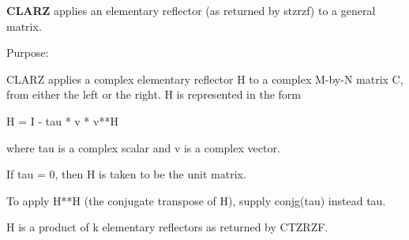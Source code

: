 {\bfseries C\+L\+A\+R\+Z} applies an elementary reflector (as returned by stzrzf) to a general matrix. 

 \begin{DoxyParagraph}{Purpose\+: }
\begin{DoxyVerb} CLARZ applies a complex elementary reflector H to a complex
 M-by-N matrix C, from either the left or the right. H is represented
 in the form

       H = I - tau * v * v**H

 where tau is a complex scalar and v is a complex vector.

 If tau = 0, then H is taken to be the unit matrix.

 To apply H**H (the conjugate transpose of H), supply conjg(tau) instead
 tau.

 H is a product of k elementary reflectors as returned by CTZRZF.\end{DoxyVerb}
 
\end{DoxyParagraph}

